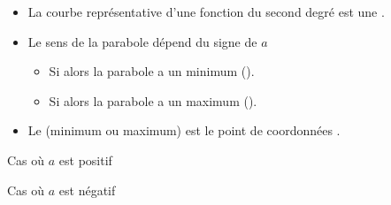 \documentclass[12pt,a4paper]{article}
\begin{document}
\begin{myprops}
	\begin{itemize}
		\item La courbe représentative d'une fonction du second degré est une .
		\item Le sens de la parabole dépend du signe de $a$
			\begin{itemize}
				\item Si  alors la parabole a un minimum ().
				\item Si  alors la parabole a un maximum ().
			\end{itemize}
		\item Le  (minimum ou maximum) est le point de coordonnées .
	\end{itemize}


\begin{multicols}{2}

Cas où $a$ est positif


Cas où $a$ est négatif


\end{multicols}

\end{myprops}
\end{document}
